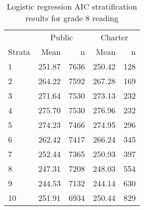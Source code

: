 \begin{table}[h!]
\centering
\caption{Logistic regression AIC stratification results for grade 8 reading} 
\label{g8read-circpsa10AIC}
\begin{tabular}{lrr@{\extracolsep{.2cm}}rr}
  \hline
   & \multicolumn{2}{c}{Public} & \multicolumn{2}{c}{Charter} \\ \cline{2-3} \cline{4-5} Strata & Mean & n & Mean & n \\ \hline
1 & 251.87 & 7636 & 250.42 & 128 \\ 
  2 & 264.22 & 7592 & 267.28 & 169 \\ 
  3 & 271.64 & 7530 & 273.13 & 232 \\ 
  4 & 275.70 & 7530 & 276.96 & 232 \\ 
  5 & 274.23 & 7466 & 274.95 & 296 \\ 
  6 & 262.42 & 7417 & 266.24 & 345 \\ 
  7 & 252.44 & 7365 & 250.93 & 397 \\ 
  8 & 247.31 & 7208 & 248.03 & 554 \\ 
  9 & 244.53 & 7132 & 244.14 & 630 \\ 
  10 & 251.91 & 6934 & 250.44 & 829 \\ 
   \hline
\end{tabular}
\end{table}
